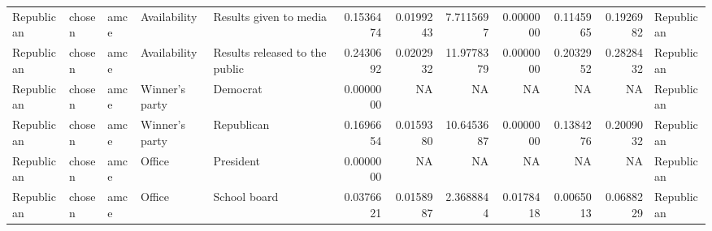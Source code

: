 \begin{table}
\begin{tabular}[t]{lllllrrrrrrl}
Republican & chosen & amce & Availability & Results given to media & 0.1536474 & 0.0199243 & 7.7115697 & 0.0000000 & 0.1145965 & 0.1926982 & Republican\\
Republican & chosen & amce & Availability & Results released to the public & 0.2430692 & 0.0202932 & 11.9778379 & 0.0000000 & 0.2032952 & 0.2828432 & Republican\\
Republican & chosen & amce & Winner's party & Democrat & 0.0000000 & NA & NA & NA & NA & NA & Republican\\
\addlinespace
Republican & chosen & amce & Winner's party & Republican & 0.1696654 & 0.0159380 & 10.6453687 & 0.0000000 & 0.1384276 & 0.2009032 & Republican\\
Republican & chosen & amce & Office & President & 0.0000000 & NA & NA & NA & NA & NA & Republican\\
Republican & chosen & amce & Office & School board & 0.0376621 & 0.0158987 & 2.3688844 & 0.0178418 & 0.0065013 & 0.0688229 & Republican\\
\bottomrule
\end{tabular}
\end{table}
